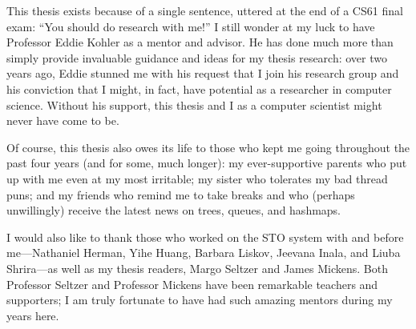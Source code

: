 This thesis exists because of a single sentence, uttered at the end of a CS61 final exam: ``You should do research with me!'' I still wonder at my luck to have Professor Eddie Kohler as a mentor and advisor. He has done much more than simply provide invaluable guidance and ideas for my thesis research: over two years ago, Eddie stunned me with his request that I join his research group and his conviction that I might, in fact, have potential as a researcher in computer science. Without his support, this thesis and I as a computer scientist might never have come to be.

    Of course, this thesis also owes its life to those who kept me going throughout the past four years (and for some, much longer): my ever-supportive parents who put up with me even at my most irritable; my sister who tolerates my bad thread puns; and my friends who remind me to take breaks and who (perhaps unwillingly) receive the latest news on trees, queues, and hashmaps.

        I would also like to thank those who worked on the STO system with and before me---Nathaniel Herman, Yihe Huang, Barbara Liskov, Jeevana Inala, and Liuba Shrira---as well as my thesis readers, Margo Seltzer and James Mickens. Both Professor Seltzer and Professor Mickens have been remarkable teachers and supporters; I am truly fortunate to have had such amazing mentors during my years here.
